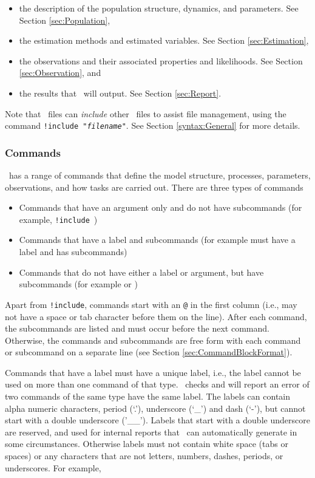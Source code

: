 \begin{itemize}
	\item the description of the population structure, dynamics, and parameters. See Section \ref{sec:Population},
	\item the estimation methods and estimated variables. See Section \ref{sec:Estimation},
	\item the observations and their associated properties and likelihoods. See Section \ref{sec:Observation}, and
	\item the results that \CNAME\ will output. See Section \ref{sec:Report}.
\end{itemize}

Note that \config\ files can \emph{include} other \config\ files to assist file management, using the command \texttt{!include "\emph{filename}"}. See Section \ref{syntax:General} for more details.

\subsubsection{Commands}

\CNAME\ has a range of commands that define the model structure, processes, parameters, observations, and how tasks are carried out. There are three types of commands

\begin{itemize}
	\item Commands that have an argument only and do not have subcommands (for example, \texttt{!include}\ )
	\item Commands that have a label and subcommands (for example  must have a label and has subcommands)
	\item Commands that do not have either a label or argument, but have subcommands (for example  or )
\end{itemize}

Apart from \texttt{!include}, commands start with an \texttt{@} in the first column (i.e., may not have a space or tab character before them on the line). After each command, the subcommands are listed and must occur before the next command. Otherwise, the commands and subcommands are free form with each command or subcommand on a separate line (see Section \ref{sec:CommandBlockFormat}).

Commands that have a label must have a unique label, i.e., the label cannot be used on more than one command of that type. \CNAME\ checks and will report an error of two commands of the same type have the same label. The labels can contain alpha numeric characters, period (`.'), underscore (`\_') and dash (`-'), but cannot start with a double underscore ('\_\_'). Labels that start with a double underscore are reserved, and used for internal reports that \CNAME\ can automatically generate in some circumstances. Otherwise labels must not contain white space (tabs or spaces) or any characters that are not letters, numbers, dashes, periods, or underscores. For example,

